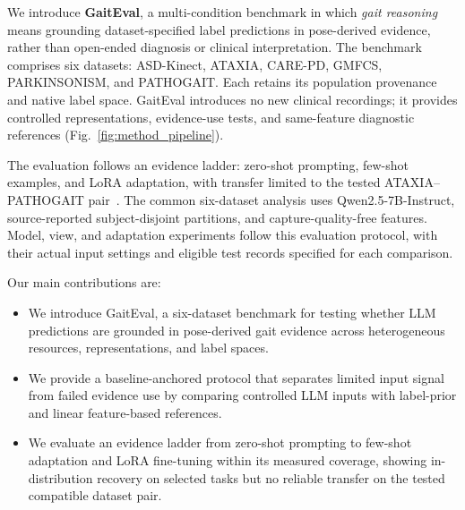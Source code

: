 We introduce \textbf{GaitEval}, a multi-condition benchmark in which \emph{gait reasoning} means grounding dataset-specified label predictions in pose-derived evidence, rather than open-ended diagnosis or clinical interpretation. The benchmark comprises six datasets: ASD-Kinect, ATAXIA, CARE-PD, GMFCS, PARKINSONISM, and PATHOGAIT. Each retains its population provenance and native label space. GaitEval introduces no new clinical recordings; it provides controlled representations, evidence-use tests, and same-feature diagnostic references (Fig.~\ref{fig:method_pipeline}).

The evaluation follows an evidence ladder: zero-shot prompting, few-shot examples, and LoRA adaptation, with transfer limited to the tested ATAXIA--PATHOGAIT pair~\cite{brown2020fewshot,hu2022lora}. The common six-dataset analysis uses Qwen2.5-7B-Instruct, source-reported subject-disjoint partitions, and capture-quality-free features. Model, view, and adaptation experiments follow this evaluation protocol, with their actual input settings and eligible test records specified for each comparison.

Our main contributions are:
\begin{itemize}[leftmargin=*,nosep]
\item We introduce GaitEval, a six-dataset benchmark for testing whether LLM predictions are grounded in pose-derived gait evidence across heterogeneous resources, representations, and label spaces.
\item We provide a baseline-anchored protocol that separates limited input signal from failed evidence use by comparing controlled LLM inputs with label-prior and linear feature-based references.
\item We evaluate an evidence ladder from zero-shot prompting to few-shot adaptation and LoRA fine-tuning within its measured coverage, showing in-distribution recovery on selected tasks but no reliable transfer on the tested compatible dataset pair.
\end{itemize}
